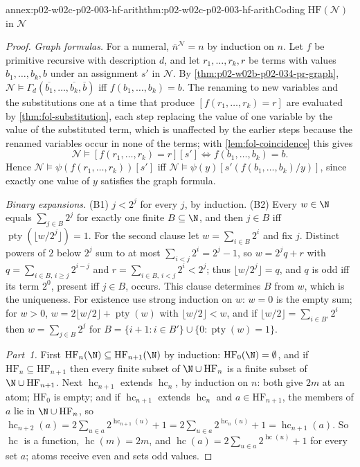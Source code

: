 \begin{annexitem}{annex:p02-w02c-p02-003-hf-arith}{thm:p02-w02c-p02-003-hf-arith}{Coding \(\mathrm{HF}(\mathcal N)\) in \(\mathcal N\)}
\begin{proof}
\emph{Graph formulas.}  For a numeral, \(\overline n^{\mathcal N}=n\) by
induction on \(n\).  Let \(f\) be primitive recursive with description
\(d\), and let \(r_1,\ldots,r_k,r\) be terms with values
\(b_1,\ldots,b_k,b\) under an assignment \(s'\) in \(\mathcal N\).  By
\cref{thm:p02-w02b-p02-034-pr-graph},
\(\mathcal N\models\Gamma_d(\overline{b_1},\ldots,\overline{b_k},\overline b)\)
iff \(f(b_1,\ldots,b_k)=b\).  The renaming to new variables and the
substitutions one at a time that produce \([f(r_1,\ldots,r_k)=r]\) are
evaluated by \cref{thm:fol-substitution}, each step replacing the value of
one variable by the value of the substituted term, which is unaffected by
the earlier steps because the renamed variables occur in none of the terms;
with \cref{lem:fol-coincidence} this gives
\[
 \mathcal N\models[f(r_1,\ldots,r_k)=r][s']
 \iff f(b_1,\ldots,b_k)=b. \tag{G}
\]
Hence \(\mathcal N\models\psi(f(r_1,\ldots,r_k))[s']\) iff
\(\mathcal N\models\psi(y)[s'(f(b_1,\ldots,b_k)/y)]\), since exactly one
value of \(y\) satisfies the graph formula.

\emph{Binary expansions.}  (B1) \(j<2^{j}\) for every \(j\), by induction.
(B2) Every \(w\in\N\) equals \(\sum_{j\in B}2^{j}\) for exactly one finite
\(B\subseteq\N\), and then \(j\in B\) iff
\(\operatorname{pty}(\lfloor w/2^{j}\rfloor)=1\).  For the second clause let
\(w=\sum_{i\in B}2^{i}\) and fix \(j\).  Distinct powers of \(2\) below
\(2^{j}\) sum to at most \(\sum_{i<j}2^{i}=2^{j}-1\), so
\(w=2^{j}q+r\) with \(q=\sum_{i\in B,\,i\geq j}2^{i-j}\) and
\(r=\sum_{i\in B,\,i<j}2^{i}<2^{j}\); thus \(\lfloor w/2^{j}\rfloor=q\),
and \(q\) is odd iff its term \(2^{0}\), present iff \(j\in B\), occurs.
This clause determines \(B\) from \(w\), which is the uniqueness.  For
existence use strong induction on \(w\): \(w=0\) is the empty sum; for
\(w>0\), \(w=2\lfloor w/2\rfloor+\operatorname{pty}(w)\) with
\(\lfloor w/2\rfloor<w\), and if \(\lfloor w/2\rfloor=\sum_{i\in B'}2^{i}\)
then \(w=\sum_{j\in B}2^{j}\) for
\(B=\{i+1:i\in B'\}\cup\{0:\operatorname{pty}(w)=1\}\).

\emph{Part~1.}  First \(\mathrm{HF}_n(\N)\subseteq\mathrm{HF}_{n+1}(\N)\)
by induction: \(\mathrm{HF}_0(\N)=\emptyset\), and if
\(\mathrm{HF}_n\subseteq\mathrm{HF}_{n+1}\) then every finite subset of
\(\N\cup\mathrm{HF}_n\) is a finite subset of \(\N\cup\mathrm{HF}_{n+1}\).
Next \(\operatorname{hc}_{n+1}\) extends \(\operatorname{hc}_n\), by
induction on \(n\): both give \(2m\) at an atom; \(\mathrm{HF}_0\) is
empty; and if \(\operatorname{hc}_{n+1}\) extends \(\operatorname{hc}_n\)
and \(a\in\mathrm{HF}_{n+1}\), the members of \(a\) lie in
\(\N\cup\mathrm{HF}_n\), so
\(\operatorname{hc}_{n+2}(a)=2\sum_{u\in a}2^{\operatorname{hc}_{n+1}(u)}+1
=2\sum_{u\in a}2^{\operatorname{hc}_{n}(u)}+1=\operatorname{hc}_{n+1}(a)\).
So \(\operatorname{hc}\) is a function, \(\operatorname{hc}(m)=2m\), and
\(\operatorname{hc}(a)=2\sum_{u\in a}2^{\operatorname{hc}(u)}+1\) for every
set \(a\); atoms receive even and sets odd values.


\end{proof}
\end{annexitem}
